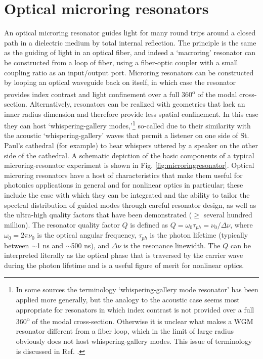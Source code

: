  
 \section{Optical microring resonators} \label{sec:OMRR}
An optical microring resonator guides light for many round trips around a closed path in a dielectric medium by total internal reflection. The principle is the same as the guiding of light in an optical fiber, and indeed a `macroring' resonator can be constructed from a loop of fiber, using a fiber-optic coupler with a small coupling ratio as an input/output port. Microring resonators can be constructed by looping an optical waveguide back on itself, in which case the resonator provides index contrast and light confinement over a full 360\textsuperscript{o} of the modal cross-section. Alternatively, resonators can be realized with geometries that lack an inner radius dimension and therefore provide less spatial confinement. In this case they can host `whispering-gallery modes,'\footnote{In some sources the terminology `whispering-gallery mode resonator' has been applied more generally, but the analogy to the acoustic case seems most appropriate for resonators in which index contrast is not provided over a full 360\textsuperscript{o} of the modal cross-section. Otherwise it is unclear what makes a WGM resonator different from a fiber loop, which in the limit of large radius obviously does not host whispering-gallery modes. This issue of terminology is discussed in Ref. .} so-called due to their similarity with the acoustic `whispering-gallery' waves that permit a listener on one side of St. Paul's cathedral (for example) to hear whispers uttered by a speaker on the other side of the cathedral. A schematic depiction of the basic components of a typical microring-resonator experiment is shown in Fig. \ref{fig:microringresonator}. Optical microring resonators have a host of characteristics that make them useful for photonics applications in general and for nonlinear optics in particular; these include the ease with which they can be integrated and the ability to tailor the spectral distribution of guided modes through careful resonator design, as well as the ultra-high quality factors that have been demonstrated ($\geq$ several hundred million). The resonator quality factor $Q$ is defined as $Q=\omega_0 \tau_{ph}=\nu_0/\Delta\nu$, where $\omega_0=2\pi\nu_0$ is the optical angular frequency, $\tau_{ph}$ is the photon lifetime (typically between $\sim$1 ns and $\sim$500 ns), and $\Delta\nu$ is the resonance linewidth. The $Q$ can be interpreted literally as the optical phase that is traversed by the carrier wave during the photon lifetime and is a useful figure of merit for nonlinear optics.

